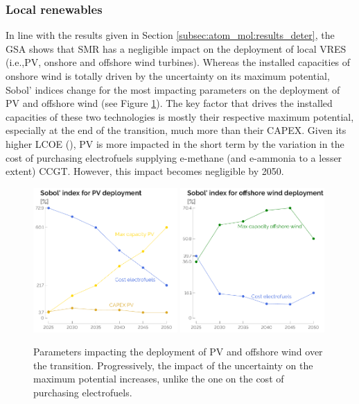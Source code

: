 \documentclass[11pt,twoside,a4paper,english]{article}
\def\ie{i.e.,}
\begin{document}
\subsubsection{Local renewables}
\label{subsubsec:atom_mol:results_uq_VRES}
In line with the results given in Section \ref{subsec:atom_mol:results_deter}, the \gls{GSA} shows that \gls{SMR} has a negligible impact on the deployment of local \gls{VRES} (\ie \gls{PV}, onshore and offshore wind turbines). Whereas the installed capacities of onshore wind is totally driven by the uncertainty on its maximum potential, Sobol' indices change for the most impacting parameters on the deployment of \gls{PV} and offshore wind (see Figure \ref{fig:results_uq_pdf_local_ren}). The key factor that drives the installed capacities of these two technologies is mostly their respective maximum potential, especially at the end of the transition, much more than their CAPEX. Given its higher \gls{LCOE} (), \gls{PV} is more impacted in the short term by the variation in the cost of purchasing electrofuels supplying e-methane (and e-ammonia to a lesser extent) \gls{CCGT}. However, this impact becomes negligible by 2050.

\begin{figure}[htbp!]
\centering
\includegraphics[width=0.49\textwidth]{Sobol_PV.pdf}
\includegraphics[width=0.49\textwidth]{Sobol_WIND_OFFSHORE.pdf}
\caption{Parameters impacting the deployment of \gls{PV} and offshore wind over the transition. Progressively, the impact of the uncertainty on the maximum potential increases, unlike the one on the cost of purchasing electrofuels.}
\label{fig:results_uq_pdf_local_ren}
\end{figure}
\end{document}
